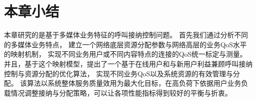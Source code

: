 \section{本章小结}
本章研究的是基于多媒体业务特征的呼叫接纳控制问题。
首先我们通过分析不同的多媒体业务特点，
建立一个网络底层资源分配参数与网络高层的业务QoS水平的映射机制，
实现不同业务用户或不同内容特点的连接的QoS统一标定与测量。 
并且，基于这个映射模型，提出了一个基于在线用户和与新用户利益兼顾呼叫接纳控制与资源分配的优化算法，
实现不同业务QoS以及系统资源的有效管理与分配。
该算法以系统整体服务质量效用为最大化目标，在高负荷下依据用户业务负载情况调整接纳与分配策略，可以让各项性能指标得到较好的平衡与折衷。
%


